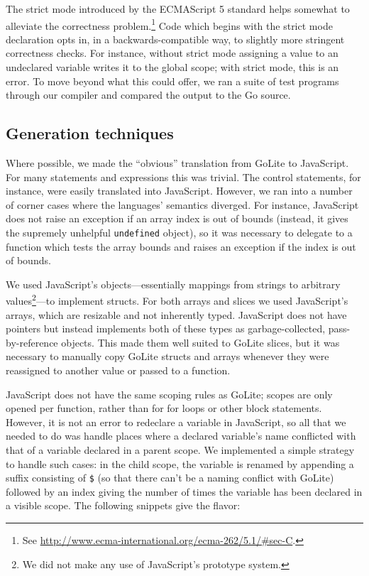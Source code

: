 \documentclass[oneside]{article}
\begin{document}
The strict mode introduced by the ECMAScript 5 standard helps somewhat to alleviate the correctness problem.\footnote{See \url{http://www.ecma-international.org/ecma-262/5.1/\#sec-C}.} Code which begins with the strict mode declaration opts in, in a backwards-compatible way, to slightly more stringent correctness checks. For instance, without strict mode assigning a value to an undeclared variable writes it to the global scope; with strict mode, this is an error. To move beyond what this could offer, we ran a suite of test programs through our compiler and compared the output to the Go source.

\subsection{Generation techniques}\label{subsec:gentech}
Where possible, we made the ``obvious'' translation from GoLite to JavaScript. For many statements and expressions this was trivial. The control statements, for instance, were easily translated into JavaScript. However, we ran into a number of corner cases where the languages' semantics diverged. For instance, JavaScript does not raise an exception if an array index is out of bounds (instead, it gives the supremely unhelpful \texttt{undefined} object), so it was necessary to delegate to a function which tests the array bounds and raises an exception if the index is out of bounds.

We used JavaScript's objects---essentially mappings from strings to arbitrary values\footnote{We did not make any use of JavaScript's prototype system.}---to implement structs. For both arrays and slices we used JavaScript's arrays, which are resizable and not inherently typed. JavaScript does not have pointers but instead implements both of these types as garbage-collected, pass-by-reference objects. This made them well suited to GoLite slices, but it was necessary to manually copy GoLite structs and arrays whenever they were reassigned to another value or passed to a function.


JavaScript does not have the same scoping rules as GoLite; scopes are only opened per function, rather than for for loops or other block statements. However, it is not an error to redeclare a variable in JavaScript, so all that we needed to do was handle places where a declared variable's name conflicted with that of a variable declared in a parent scope. We implemented a simple strategy to handle such cases: in the child scope, the variable is renamed by appending a suffix consisting of \texttt{\$} (so that there can't be a naming conflict with GoLite) followed by an index giving the number of times the variable has been declared in a visible scope. The following snippets give the flavor:
\end{document}
